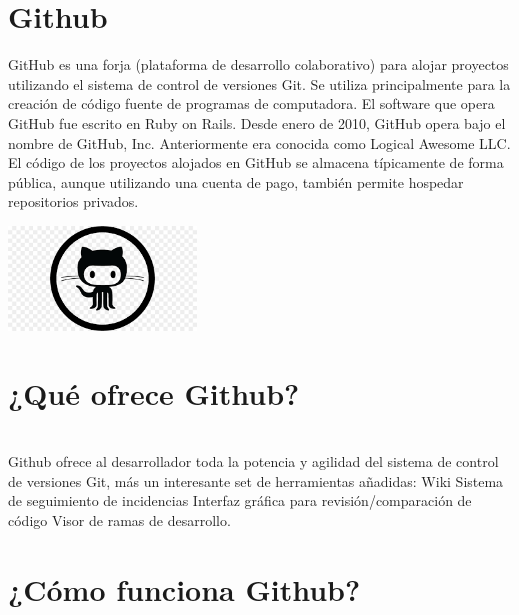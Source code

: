 \section{Github} 
GitHub es una forja (plataforma de desarrollo colaborativo) para alojar proyectos utilizando el sistema de control de versiones Git. Se utiliza principalmente para la creación de código fuente de programas de computadora. El software que opera GitHub fue escrito en Ruby on Rails. Desde enero de 2010, GitHub opera bajo el nombre de GitHub, Inc. Anteriormente era conocida como Logical Awesome LLC. El código de los proyectos alojados en GitHub se almacena típicamente de forma pública, aunque utilizando una cuenta de pago, también permite hospedar repositorios privados.
\begin{itemize}
	\begin{center}
	\includegraphics[width=5cm]{./Imagenes/imagen1} 
	\end{center}
\end{itemize}


\section{¿Qué ofrece Github?} \\

Github ofrece al desarrollador toda la potencia y agilidad del sistema de control de versiones Git, más un interesante set de herramientas añadidas:
Wiki
Sistema de seguimiento de incidencias
Interfaz gráfica para revisión/comparación de código
Visor de ramas de desarrollo. \\


\section{¿Cómo funciona Github?} \\


